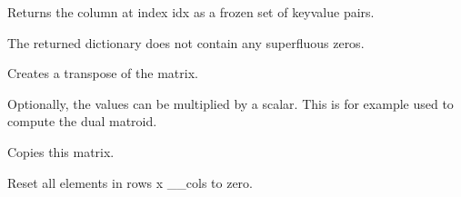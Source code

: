\documentclass[letterpaper,12pt,english]{sphinxmanual}
\begin{document}
\begin{fulllineitems}

\begin{fulllineitems}
\label{\detokenize{api/modules:cbmpy.fluxmodules.sparserationals.Matrix.getCol}}
\pysigstartsignatures
\pysiglinewithargsret
{}
{}
{}
\pysigstopsignatures
\sphinxAtStartPar
Returns the column at index idx as a frozen set of key\sphinxhyphen{}value pairs.

\sphinxAtStartPar
The returned dictionary does not contain any superfluous zeros.

\end{fulllineitems}


\begin{fulllineitems}
\label{\detokenize{api/modules:cbmpy.fluxmodules.sparserationals.Matrix.transpose}}
\pysigstartsignatures
\pysiglinewithargsret
{}
{}
{}
\pysigstopsignatures
\sphinxAtStartPar
Creates a transpose of the matrix.

\sphinxAtStartPar
Optionally, the values can be multiplied by a scalar. This is for example used
to compute the dual matroid.

\end{fulllineitems}


\begin{fulllineitems}
\label{\detokenize{api/modules:cbmpy.fluxmodules.sparserationals.Matrix.copy}}
\pysigstartsignatures
\pysiglinewithargsret
{}
{}
{}
\pysigstopsignatures
\sphinxAtStartPar
Copies this matrix.

\end{fulllineitems}


\begin{fulllineitems}
\label{\detokenize{api/modules:cbmpy.fluxmodules.sparserationals.Matrix.reset}}
\pysigstartsignatures
\pysiglinewithargsret
{}
{\sphinxparamcomma {}}
{}
\pysigstopsignatures
\sphinxAtStartPar
Reset all elements in rows x \_\_cols to zero.


\end{fulllineitems}
\end{fulllineitems}
\end{document}
